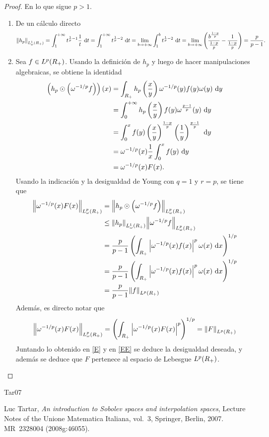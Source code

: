 \documentclass[10pt,a4paper]{report}
\newcommand{\abs}[2][y]{\if#1y\left\fi\lvert#2\if#1y\right\fi\rvert}
\newcommand{\norm}[2][y]{{\if#1y\left\fi\lVert#2\if#1y\right\fi\rVert}}
\theoremstyle{definition}
\renewcommand{\theproblem}{\Alph{problem}}
\numberwithin{equation}{problem}
\providecommand{\abs}[1]{\left\lvert#1\right\rvert}
\providecommand{\norm}[1]{\left\lVert#1\right\rVert}
\begin{document}
	\begin{proof}
		En lo que sigue $p>1$.
		\begin{enumerate}[label=\textbf{\theproblem.\Roman{*}.},ref=\theproblem.\Roman{*},parsep=1ex]
			\item De un cálculo directo
			\begin{align*}
				\norm{h_{p}}_{L^{1}_{\omega}(\RP)}  = \int_{1}^{+\infty} t^{\frac{1}{p}-1}\frac{1}{t}\ \text{d}t = \int_{1}^{+\infty} t^{\frac{1}{p}-2}\ \text{d}t = \lim_{b\to+\infty} \int_{1}^{b}t^{\frac{1}{p}-2}\ \text{d}t = \lim_{b\to+\infty}\left(\frac{b^{\frac{1-p}{p}}}{\frac{1-p}{p}} - \frac{1}{\frac{1-p}{p}}\right) = \frac{p}{p-1}.
			\end{align*}
		\item Sea $f\in L^{p}(R_+)$. Usando la definición de $h_{p}$ y luego de hacer manipulaciones algebraicas, se obtiene la identidad
		\begin{align*}
			\left(h_{p}\odot\left(\omega^{-1/p}f\right)\right)(x) &= \int_{\RP} h_{p}\left(\frac{x}{y}\right)\omega^{-1/p}(y)f(y)\omega(y)\ \text{d}y\\ &= \int_{0}^{+\infty} h_{p}\left(\frac{x}{y}\right)f(y)\omega^{\frac{p-1}{p}}(y)\ \text{d}y\\ &= \int_{0}^{x}f(y) \left(\frac{x}{y}\right)^{\frac{1-p}{p}}\left(\frac{1}{y}\right)^{\frac{p-1}{p}}\ \text{d}y\\
			&= \omega^{-1/p}(x)\frac{1}{x}\int_{0}^{x}f(y)\ \text{d}y\\
			&= \omega^{-1/p}(x)F(x).
		\end{align*}
	    Usando la indicación y la desigualdad de Young con $q = 1$ y $r = p$, se tiene que 
	    \begin{align}
	    	\norm{\omega^{-1/p}(x)F(x)}_{L^{p}_{\omega}(\RP)} &= \norm{h_{p}\odot\left(\omega^{-1/p}f\right)}_{L^{p}_{\omega}(\RP)}\nonumber\\ &\leq \norm{h_{p}}_{L^{1}_{\omega}(\RP)}\norm{\omega^{-1/p}f}_{L^{p}_{\omega}(\RP)}\nonumber\\ &= \frac{p}{p-1}\left(\int_{\RP}\abs{\omega^{-1/p}(x)f(x)}^{p}\omega(x)\ \text{d}x\right)^{1/p}\nonumber\\
	    	&= \frac{p}{p-1}\left(\int_{\RP}\abs{\omega^{-1/p}(x)f(x)}^{p}\omega(x)\ \text{d}x\right)^{1/p}\nonumber\\
	    	&= \frac{p}{p-1}\norm{f}_{L^{p}(\RP)}\label{E}
	    \end{align} 
        Además, es directo notar que
        \begin{align}
        	\norm{\omega^{-1/p}(x)F(x)}_{L^{p}_{\omega}(\RP)} = \left(\int_{\RP}\abs{\omega^{-1/p}(x)F(x)}^{p}\right)^{1/p} = \norm{F}_{L^{p}(\RP)}\label{EE}
        \end{align}
        Juntando lo obtenido en \eqref{E} y en \eqref{EE} se deduce la desigualdad deseada, y además se deduce que $F$ pertenece al espacio de Lebesgue $L^{p}(R_+)$.
		\end{enumerate}
	\end{proof}
	
	
	\begin{thebibliography}{Tar07}
		
		Luc Tartar, \emph{An introduction to {S}obolev spaces and interpolation spaces}, Lecture Notes of the Unione Matematica Italiana, vol.~3, Springer, Berlin, 2007. MR~2328004 (2008g:46055).
		
	\end{thebibliography}
\end{document}
